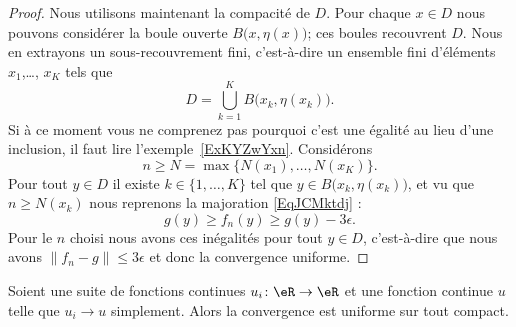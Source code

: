 \begin{proof}
	Nous utilisons maintenant la compacité de \( D\). Pour chaque \( x\in D\) nous pouvons considérer la boule ouverte \( B\big( x,\eta(x) \big)\); ces boules recouvrent \( D\). Nous en extrayons un sous-recouvrement fini, c'est-à-dire un ensemble fini d'éléments \( x_1\),\ldots, \( x_K\) tels que
	\begin{equation}
		D=\bigcup_{k=1}^K B\big(x_k,\eta(x_k)\big).
	\end{equation}
	Si à ce moment vous ne comprenez pas pourquoi c'est une égalité au lieu d'une inclusion, il faut lire l'exemple~\ref{ExKYZwYxn}. Considérons
	\begin{equation}
		n\geq N=\max\{ N(x_1),\ldots, N(x_K) \}.
	\end{equation}
	Pour tout \( y\in D\) il existe \( k\in\{ 1,\ldots, K \}\) tel que \( y\in B\big( x_k,\eta(x_k) \big)\), et vu que \( n\geq N(x_k)\) nous reprenons la majoration \eqref{EqJCMktdj} :
	\begin{equation}
		g(y)\geq f_n(y)\geq g(y)-3\epsilon.
	\end{equation}
	Pour le \( n\) choisi nous avons ces inégalités pour tout \( y\in D\), c'est-à-dire que nous avons \( \| f_n-g \|\leq 3\epsilon\) et donc la convergence uniforme.
\end{proof}

\begin{proposition}      \label{PROPooFWVIooCzXojO}
	Soient une suite de fonctions continues \( u_i\colon \eR\to \eR\) et une fonction continue \( u\) telle que \( u_i\to u\) simplement. Alors la convergence est uniforme sur tout compact.
\end{proposition}

